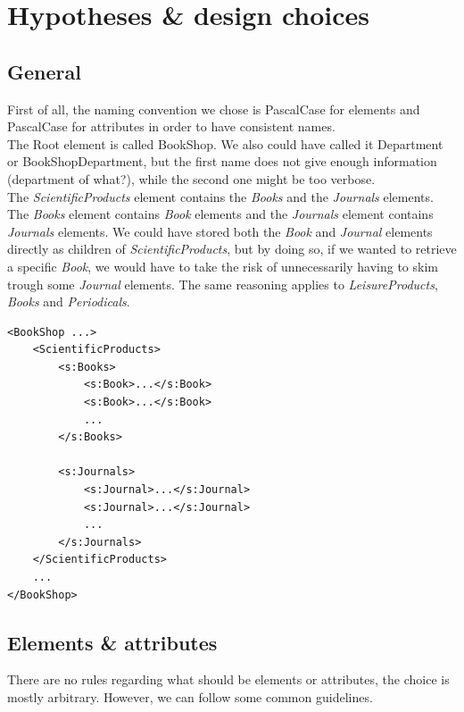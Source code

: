\section{Hypotheses \& design choices}

\subsection{General}

First of all, the naming convention we chose is PascalCase for elements and
PascalCase for attributes in order to have consistent names.\\

The Root element is called BookShop. We also could have called it
Department or BookShopDepartment, but the first name does not give enough
information (department of what?), while the second one might be too verbose.\\

The \emph{ScientificProducts} element contains the \emph{Books} and the
\emph{Journals} elements. The \emph{Books} element contains \emph{Book} elements
and the \emph{Journals} element contains \emph{Journals} elements.
We could have stored both the \emph{Book} and \emph{Journal} elements directly
as children of \emph{ScientificProducts}, but by doing so, if we wanted to
retrieve a specific \emph{Book}, we would have to take the risk of unnecessarily
having to skim trough some \emph{Journal} elements.
The same reasoning applies to \emph{LeisureProducts}, \emph{Books} and
\emph{Periodicals}.
\begin{lstlisting}
<BookShop ...>
    <ScientificProducts>
        <s:Books>
            <s:Book>...</s:Book>
            <s:Book>...</s:Book>
            ...
        </s:Books>
        
        <s:Journals>
            <s:Journal>...</s:Journal>
            <s:Journal>...</s:Journal>
            ...
        </s:Journals>
    </ScientificProducts>
    ...
</BookShop>
\end{lstlisting}

\subsection{Elements \& attributes \small{
    \cite{cite:ibmGuidelines} \cite{cite:soAttrElem}
    \cite{cite:ukGovTalkGuidelines}
}}

There are no rules regarding what should be elements or attributes, the choice
is mostly arbitrary. However, we can follow some common guidelines.\\

